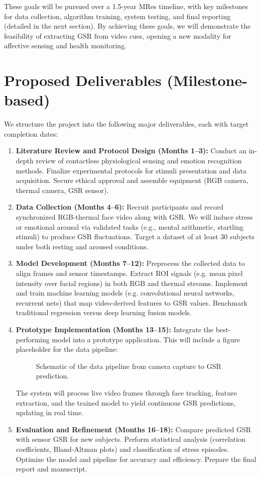 \documentclass[12pt]{article}
\begin{document}
    These goals will be pursued over a 1.5-year MRes timeline, with key milestones for data collection, algorithm training, system testing, and final reporting (detailed in the next section). By achieving these goals, we will demonstrate the feasibility of extracting GSR from video cues, opening a new modality for affective sensing and health monitoring.


    \section{Proposed Deliverables (Milestone-based)}
    We structure the project into the following major deliverables, each with target completion dates:
    \begin{enumerate}
        \item \textbf{Literature Review and Protocol Design (Months 1--3):} Conduct an in-depth review of contactless physiological sensing and emotion recognition methods. Finalize experimental protocols for stimuli presentation and data acquisition. Secure ethical approval and assemble equipment (RGB camera, thermal camera, GSR sensor).
        \item \textbf{Data Collection (Months 4--6):} Recruit participants and record synchronized RGB-thermal face video along with GSR. We will induce stress or emotional arousal via validated tasks (e.g., mental arithmetic, startling stimuli) to produce GSR fluctuations. Target a dataset of at least 30 subjects under both resting and aroused conditions.
        \item \textbf{Model Development (Months 7--12):} Preprocess the collected data to align frames and sensor timestamps. Extract ROI signals (e.g. mean pixel intensity over facial regions) in both RGB and thermal streams. Implement and train machine learning models (e.g. convolutional neural networks, recurrent nets) that map video-derived features to GSR values. Benchmark traditional regression versus deep learning fusion models.
        \item \textbf{Prototype Implementation (Months 13--15):} Integrate the best-performing model into a prototype application. This will include a figure placeholder for the data pipeline:
        \begin{figure}[ht]
            \centering
            \caption{Schematic of the data pipeline from camera capture to GSR prediction.}
            \label{fig:pipeline}
        \end{figure}
        The system will process live video frames through face tracking, feature extraction, and the trained model to yield continuous GSR predictions, updating in real time.
        \item \textbf{Evaluation and Refinement (Months 16--18):} Compare predicted GSR with sensor GSR for new subjects. Perform statistical analysis (correlation coefficients, Bland-Altman plots) and classification of stress episodes. Optimize the model and pipeline for accuracy and efficiency. Prepare the final report and manuscript.
    \end{enumerate}
\end{document}
